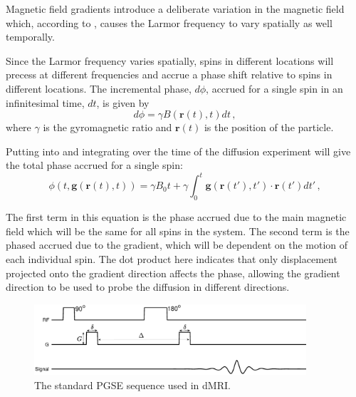 Magnetic field gradients introduce a deliberate variation in the magnetic field which, according to , causes the Larmor frequency to vary spatially as well temporally.

Since the Larmor frequency varies spatially, spins in different locations will precess at different frequencies and accrue a phase shift relative to spins in different locations. 
The incremental phase, $d\phi$, accrued for a single spin in an infinitesimal time, $dt$, %
is given by
\begin{equation}
  d\phi = \gamma B(\mathbf{r}(t), t) dt\,,
  \label{eq:dphi}
\end{equation}
where $\gamma$ is the gyromagnetic ratio and  $\mathbf{r}(t)$ is the position of the particle. %

Putting  into  and integrating over the time of the diffusion experiment will give the total phase accrued for a single spin:
\begin{equation}
  \phi(t, \mathbf{g}(\mathbf{r}(t), t)) = \gamma B_0 t + \gamma \int_0^t \mathbf{g}(\mathbf{r}(t'), t')\cdot\mathbf{r}(t')dt'\,,
  \label{eq:phase_singlespin}
\end{equation}


The first term in this equation is the phase accrued due to the main magnetic field which will be the same for all spins in the system.
The second term is the phased accrued due to the gradient, which will be dependent on the motion of each individual spin.
The dot product here indicates that only displacement projected onto the gradient direction affects the phase, allowing the gradient direction to be used to probe the diffusion in different directions.

\begin{figure}
  \centering
  \includegraphics[width=0.9\textwidth]{figures/background/PGSE_diagram.eps}
  \caption{The standard \acl{PGSE} sequence used in \ac{dMRI}.}
  \label{fig:PGSE_diagram}
\end{figure}

